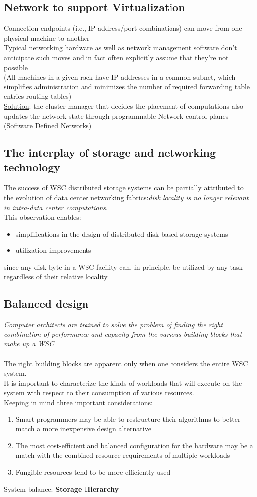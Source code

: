 \documentclass[10pt, oneside]{article}
\begin{document}
\subsection{Network to support Virtualization}
Connection endpoints (i.e., IP address/port combinations) can move from one physical machine to another\\ 
Typical networking hardware as well as network management software don’t anticipate such moves and in fact often explicitly assume that they’re not possible \\ (All machines in a given rack have IP addresses in a common subnet, which simplifies administration and minimizes the number of required forwarding table entries routing tables)\\ \underline{Solution}: the cluster manager that decides the placement of computations also updates the network state through programmable Network control planes (Software Defined Networks)
\subsection{The interplay of storage and networking technology}
The success of WSC distributed storage systems can be partially attributed to the evolution of data center networking fabrics:{\sl disk locality is no longer relevant in intra-data center computations}.\\
This observation enables:
\begin{itemize}
    \item simplifications in the design of distributed disk-based storage
    systems
    \item utilization improvements
\end{itemize}since any disk byte in a WSC facility can, in principle, be utilized by any task regardless of their relative locality
\subsection{Balanced design}
{\sl  Computer architects are trained to solve the problem of finding the right combination of performance and capacity from the various building blocks that make up a WSC}\\ \\
The right building blocks are apparent only when one considers the entire WSC system.\\
It is important to characterize the kinds of workloads that will execute on the system with respect to their consumption of various resources.\\
Keeping in mind three important considerations:
\begin{enumerate}
    \item Smart programmers may be able to restructure their algorithms to
    better match a more inexpensive design alternative
    \item The most cost-efficient and balanced configuration for the hardware may be a match with the combined resource requirements of multiple workloads
    \item Fungible resources tend to be more efficiently used
\end{enumerate}
System balance: {\bf Storage Hierarchy}
\end{document}
